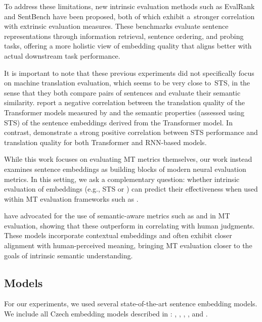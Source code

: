 To address these limitations, new intrinsic evaluation methods such as EvalRank \citep{wang-etal-2022-just} and SentBench \citep{xiaoming-etal-2023-sentbench} have been proposed, both of which exhibit a~stronger correlation with extrinsic evaluation measures. These benchmarks evaluate sentence representations through information retrieval, sentence ordering, and probing tasks, offering a more holistic view of embedding quality that aligns better with actual downstream task performance. %

It is important to note that these previous experiments did not specifically focus on machine translation evaluation, which seems to be very close to~STS, in the sense that they both compare pairs of sentences and evaluate their semantic similarity. \cite{cifka-bojar-2018-bleu} report a negative correlation between the translation quality of the Transformer models measured by \bleu and the semantic properties (assessed using STS) of the sentence embeddings derived from the Transformer model. In contrast, \cite{libovicky-probing} demonstrate a strong positive correlation between STS performance and translation quality for both Transformer and RNN-based models. %

While this work focuses on evaluating MT metrics themselves, our work instead examines sentence embeddings as building blocks of modern neural evaluation metrics. In this setting, we ask a complementary question: whether intrinsic evaluation of embeddings (e.g., STS or \costra) can predict their effectiveness when used within MT evaluation frameworks such as \comet.

\cite{freitag-etal-2022-results} have advocated for the use of semantic-aware metrics such as \bertscore \citep{bertscore:2020} and \comet \citep{rei-etal-2020-comet} in MT evaluation, showing that these outperform \bleu in correlating with human judgments. These models incorporate contextual embeddings and often exhibit closer alignment with human-perceived meaning, bringing MT evaluation closer to the goals of intrinsic semantic understanding.

\subsection{Models}
For our experiments, we used several state-of-the-art sentence embedding models. We include all Czech embedding models described in : \czert, \fernet, \robeczech, \retromae, and \simcse. 

